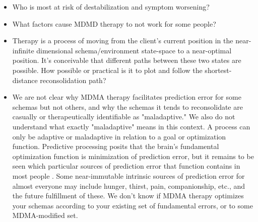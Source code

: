 \documentclass[12pt,letterpaper]{book}
\begin{document}
\begin{itemize}
    \item Who is most at risk of destabilization and symptom worsening?
    \item What factors cause MDMD therapy to not work for some people?
    \item Therapy is a process of moving from the client's current position in the near-infinite dimensional schema/environment state-space to a near-optimal position. It's conceivable that different paths between these two states are possible. How possible or practical is it to plot and follow the shortest-distance reconsolidation path?
    \item We are not clear why MDMA therapy facilitates prediction error for some schemas but not others, and why the schemas it tends to reconsolidate are casually or therapeutically identifiable as "maladaptive." We also do not understand what exactly "maladaptive" means in this context. A process can only be adaptive or maladaptive in relation to a goal or optimization function. Predictive processing posits that the brain's fundamental optimization function is minimization of prediction error, but it remains to be seen which particular sources of prediction error that function contains in most people \cite{clark2015surfing}. Some near-immutable intrinsic sources of prediction error for almost everyone may include hunger, thirst, pain, companionship, etc., and the future fulfillment of these. We don't know if MDMA therapy optimizes your schemas according to your existing set of fundamental errors, or to some MDMA-modified set.
\end{itemize}
\backmatter
\printbibliography
{}
\end{document}
